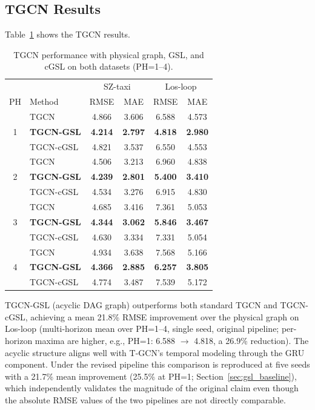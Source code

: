 \subsection{TGCN Results}

Table~\ref{tab:tgcn_gsl_combined} shows the TGCN results.

\begin{table}[!t]
\centering
\caption{TGCN performance with physical graph, GSL, and cGSL on both datasets (PH=1--4).}
\label{tab:tgcn_gsl_combined}
\small
\begin{tabular}{cl|cc|cc}
\toprule
& & \multicolumn{2}{c}{SZ-taxi} & \multicolumn{2}{c}{Los-loop} \\
PH & Method & RMSE & MAE & RMSE & MAE \\
\midrule
& TGCN & 4.866 & 3.606 & 6.588 & 4.573 \\
1 & \textbf{TGCN-GSL} & \textbf{4.214} & \textbf{2.797} & \textbf{4.818} & \textbf{2.980} \\
& TGCN-cGSL & 4.821 & 3.537 & 6.550 & 4.553 \\
\midrule
& TGCN & 4.506 & 3.213 & 6.960 & 4.838 \\
2 & \textbf{TGCN-GSL} & \textbf{4.239} & \textbf{2.801} & \textbf{5.400} & \textbf{3.410} \\
& TGCN-cGSL & 4.534 & 3.276 & 6.915 & 4.830 \\
\midrule
& TGCN & 4.685 & 3.416 & 7.361 & 5.053 \\
3 & \textbf{TGCN-GSL} & \textbf{4.344} & \textbf{3.062} & \textbf{5.846} & \textbf{3.467} \\
& TGCN-cGSL & 4.630 & 3.334 & 7.331 & 5.054 \\
\midrule
& TGCN & 4.934 & 3.638 & 7.568 & 5.166 \\
4 & \textbf{TGCN-GSL} & \textbf{4.366} & \textbf{2.885} & \textbf{6.257} & \textbf{3.805} \\
& TGCN-cGSL & 4.774 & 3.487 & 7.539 & 5.172 \\
\bottomrule
\end{tabular}
\end{table}

TGCN-GSL (acyclic DAG graph) outperforms both standard TGCN and TGCN-cGSL, achieving a mean 21.8\% RMSE improvement over the physical graph on Los-loop (multi-horizon mean over PH=1--4, single seed, original pipeline; per-horizon maxima are higher, e.g., PH=1: 6.588 $\rightarrow$ 4.818, a 26.9\% reduction). The acyclic structure aligns well with T-GCN's temporal modeling through the GRU component. Under the revised pipeline this comparison is reproduced at five seeds with a 21.7\% mean improvement (25.5\% at PH=1; Section~\ref{sec:gsl_baseline}), which independently validates the magnitude of the original claim even though the absolute RMSE values of the two pipelines are not directly comparable.

